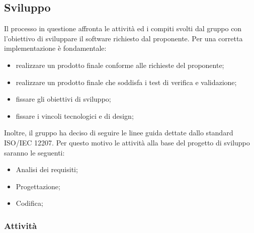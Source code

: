 \subsection{Sviluppo}
Il processo in questione affronta le attività ed i compiti svolti dal gruppo con l'obiettivo di sviluppare il software richiesto dal proponente. Per una corretta implementazione è fondamentale:
\begin{itemize}
		\item realizzare un prodotto finale conforme alle richieste del proponente; 	
		\item realizzare un prodotto finale che soddisfa i test di verifica e validazione; 	
		\item fissare gli obiettivi di sviluppo; 	
		\item fissare i vincoli tecnologici e di design; 	
\end{itemize}
Inoltre, il gruppo ha deciso di seguire le linee guida dettate dallo standard ISO/IEC 12207. Per questo motivo le attività alla base del progetto di sviluppo saranno le seguenti:
\begin{itemize}
	\item Analisi dei requisiti; 	
	\item Progettazione;	
	\item Codifica; 	
\end{itemize}
\subsubsection{Attività}
